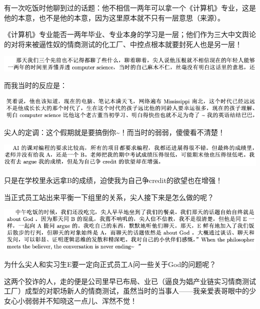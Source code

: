 \documentclass[9pt, b5paper]{article}
\begin{document}
有一次吃饭时他聊到过的话题：他不相信一两年可以拿一个《计算机》专业，这是他的本意，也不是他的本意，因为这里原本就不只有一层意思（来源）。

《计算机》专业能否一两年毕业、专业本身的学习是一层；他们作为三大中文舆论的对将来被逼性奴的情商测试的化工厂、中控点根本就要封死人也是另一层！

\begin{center}
\includegraphics[width=.9\linewidth]{./pic/backups_plans_20210507_091356.png}
\end{center}

而我当时的反应是： 

\begin{center}
\includegraphics[width=.9\linewidth]{./pic/backups_plans_20210507_091418.png}
\end{center}

尖人的定调：这个假期就是要搞倒你\textasciitilde{}！而当时的弱弱，傻傻看不清楚！

\begin{center}
\includegraphics[width=.9\linewidth]{./pic/backups_plans_20210424_215822.png}
\end{center}

只是在学校里永远拿B的成绩，迫使我为自己争credit的欲望也在增强！

当正式员工站出来平衡一下组里的关系，尖人接下来是怎么做的呢？

\begin{center}
\includegraphics[width=.9\linewidth]{./pic/backups_plans_20210507_103521.png}
\end{center}

为什么尖人和实习生E要一定向正式员工A问一些关于God的问题呢？

这两个狡诈的人，走的便是公司里早已布局、业已（逼良为娼产业链实习情商测试工厂）成型的对职场新人的情商测试，虽然当时的当事人——我亲爱表哥眼中的少女心小弱弱并不知晓这一点儿、浑然不觉！
\end{document}

